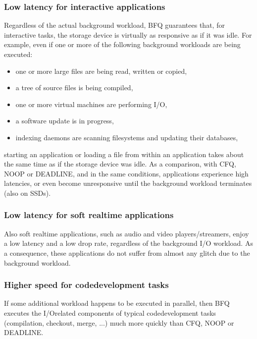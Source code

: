 \documentclass[a4paper,11pt,english]{sphinxmanual}
\begin{document}
\subsubsection{Low latency for interactive applications}
\label{\detokenize{bfq-iosched:low-latency-for-interactive-applications}}
Regardless of the actual background workload, BFQ guarantees that, for
interactive tasks, the storage device is virtually as responsive as if
it was idle. For example, even if one or more of the following
background workloads are being executed:
\begin{itemize}
\item {} 
one or more large files are being read, written or copied,

\item {} 
a tree of source files is being compiled,

\item {} 
one or more virtual machines are performing I/O,

\item {} 
a software update is in progress,

\item {} 
indexing daemons are scanning filesystems and updating their
databases,

\end{itemize}

starting an application or loading a file from within an application
takes about the same time as if the storage device was idle. As a
comparison, with CFQ, NOOP or DEADLINE, and in the same conditions,
applications experience high latencies, or even become unresponsive
until the background workload terminates (also on SSDs).


\subsubsection{Low latency for soft real\sphinxhyphen{}time applications}
\label{\detokenize{bfq-iosched:low-latency-for-soft-real-time-applications}}
Also soft real\sphinxhyphen{}time applications, such as audio and video
players/streamers, enjoy a low latency and a low drop rate, regardless
of the background I/O workload. As a consequence, these applications
do not suffer from almost any glitch due to the background workload.


\subsubsection{Higher speed for code\sphinxhyphen{}development tasks}
\label{\detokenize{bfq-iosched:higher-speed-for-code-development-tasks}}
If some additional workload happens to be executed in parallel, then
BFQ executes the I/O\sphinxhyphen{}related components of typical code\sphinxhyphen{}development
tasks (compilation, checkout, merge, ...) much more quickly than CFQ,
NOOP or DEADLINE.
\end{document}
